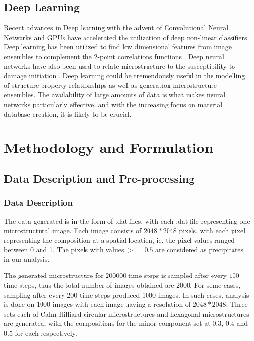 \documentclass[12pt, a4paper]{report}
\begin{document}
\section{Deep Learning}

Recent advances in Deep learning with the advent of Convolutional Neural Networks \cite{24lecun2015deep} and GPUs have accelerated the utilization of deep non-linear classifiers. Deep learning has been utilized to find low dimensional features from image ensembles to complement the 2-point correlations functions \cite{25lubbers2017inferring}. Deep neural networks have also been used to relate microstructure to the susceptibility to damage initiation \cite{26venkatraman2020reduced}. Deep learning could be tremendously useful in the modelling of structure property relationships as well as generation microstructure ensembles. The availability of large amounts of data is what makes neural networks particularly effective, and with the increasing focus on material database creation, it is likely to be crucial.


















\chapter{Methodology and Formulation
}
\section{Data Description and Pre-processing}

\subsection{Data Description}
The data generated is in the form of .dat files, with each .dat file representing one microstructural image. Each image consists of $2048* 2048$ pixels, with each pixel representing the composition at a spatial location, ie. the pixel values ranged between 0 and 1. The pixels with values $>=0.5$ are considered as precipitates in our analysis.

The generated microstructure for $200000$ time steps is sampled after every $100$ time steps, thus the total number of images obtained are $2000$. For some cases, sampling after every 200 time steps produced 1000 images. In such cases, analysis is done on $1000$ images with each image having a resolution of $2048*2048$. Three sets each of Cahn-Hilliard circular microstructures and hexagonal microstructures are generated, with the compositions for the minor component set at $0.3$, $0.4$ and $0.5$ for each respectively.
\end{document}
